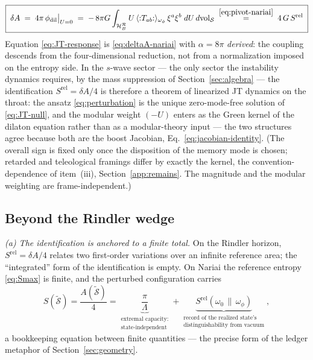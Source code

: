 \documentclass[11pt]{article}
\newcommand{\Srel}{S^{\mathrm{rel}}}
\newcommand{\Nariai}{Nariai}
\begin{document}
\begin{equation}
\boxed{\;
\delta A
\;=\; 4\pi\, \phi_{\mathrm{dil}}\big|_{U = 0}
\;=\; -\,8\pi G \int_{\mathcal{H}_B^{\mathcal{R}}} U\, \langle{:}T_{ab}{:}\rangle_{\omega_\phi}\, \xi^a\xi^b\; dU\, d\mathrm{vol}_{\mathcal{S}}
\;\overset{\eqref{eq:pivot-nariai}}{=}\;
4\,G\, \Srel
\;}
\label{eq:JT-response}
\end{equation}
Equation \eqref{eq:JT-response} is \eqref{eq:deltaA-nariai} with $\alpha = 8\pi$ \emph{derived}: the coupling descends from the four-dimensional reduction, not from a normalization imposed on the entropy side. In the $s$-wave sector --- the only sector the instability dynamics requires, by the mass suppression of Section~\ref{sec:algebra} --- the identification $\Srel = \delta A/4$ is therefore a theorem of linearized JT dynamics on the throat: the ansatz \eqref{eq:perturbation} is the unique zero-mode-free solution of \eqref{eq:JT-null}, and the modular weight $(-U)$ enters as the Green kernel of the dilaton equation rather than as a modular-theory input --- the two structures agree because both are the boost Jacobian, Eq.~\eqref{eq:jacobian-identity}. (The overall sign is fixed only once the disposition of the memory mode is chosen; retarded and teleological framings differ by exactly the kernel, the convention-dependence of item~(iii), Section~\ref{app:remains}. The magnitude and the modular weighting are frame-independent.)

\subsection{Beyond the Rindler wedge}

\emph{(a) The identification is anchored to a finite total.} On the Rindler horizon, $\Srel = \delta A/4$ relates two first-order variations over an infinite reference area; the ``integrated'' form of the identification is empty. On \Nariai{} the reference entropy \eqref{eq:Smax} is finite, and the perturbed configuration carries
\begin{equation}
S(\tilde{\mathcal{S}}) = \frac{A(\tilde{\mathcal{S}})}{4} =
\underbrace{\frac{\pi}{\Lambda}}_{\substack{\text{extremal capacity:}\\ \text{state-independent}}}
+ \underbrace{\Srel(\omega_0\,\|\,\omega_\phi)}_{\substack{\text{record of the realized state's}\\ \text{distinguishability from vacuum}}},
\label{eq:ledger}
\end{equation}
a bookkeeping equation between finite quantities --- the precise form of the ledger metaphor of Section~\ref{sec:geometry}.
\end{document}
